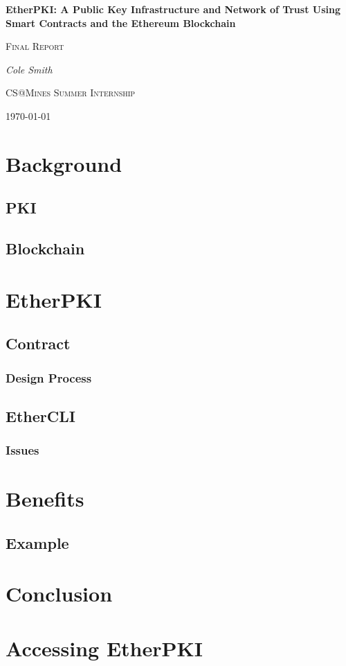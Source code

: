 \documentclass[12pt]{report}
\begin{document}
    \begin{titlepage}
        \centering
        {\huge\bfseries EtherPKI: A Public Key Infrastructure and Network of Trust Using Smart Contracts and the Ethereum Blockchain\par}
        \vspace{1.5cm}

        {\LARGE\scshape Final Report}
        \vspace{1.5cm}

        {\Large\itshape Cole Smith\par}
        \vfill
        
        {\LARGE\scshape CS@Mines Summer Internship\par}
        \vfill
        {\large \today\par}
    \end{titlepage}



    \chapter{Background}
        \section{PKI}

        \section{Blockchain}



    \chapter{EtherPKI}
        \section{Contract}
            \subsection{Design Process}

        \section{EtherCLI}
            \subsection{Issues}


    \chapter{Benefits}
        \section{Example}
    


    \chapter{Conclusion}
    
    
    
    \chapter{Accessing EtherPKI}
\end{document}
